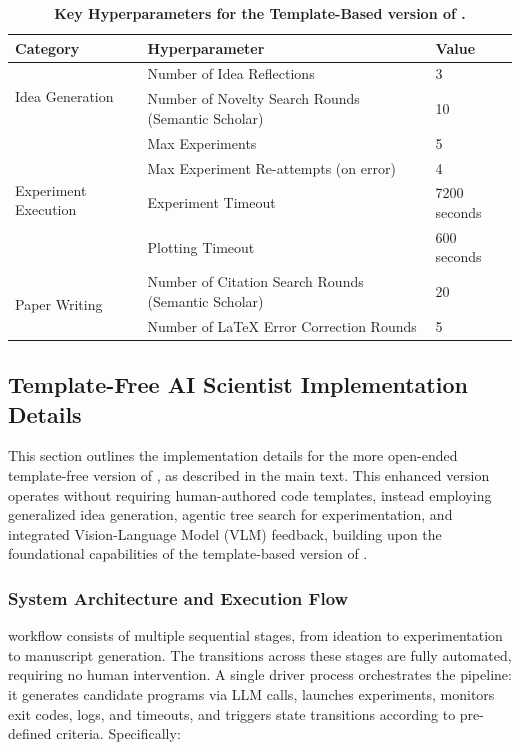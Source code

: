 \begin{appendices}
\begin{table}[h!]
\centering
\caption{\textbf{Key Hyperparameters for the Template-Based version of \ouralgo.}}
\label{tab:v1_hyperparameters}
\begin{tabular}{@{}lll@{}}
\toprule
\textbf{Category} & \textbf{Hyperparameter} & \textbf{Value} \\ \midrule
\multirow{2}{*}{Idea Generation} & Number of Idea Reflections & 3 \\
 & Number of Novelty Search Rounds (Semantic Scholar) & 10 \\ \midrule
\multirow{4}{*}{Experiment Execution} & Max Experiments & 5 \\
 & Max Experiment Re-attempts (on error) & 4 \\
 & Experiment Timeout & 7200 seconds \\
 & Plotting Timeout & 600 seconds \\ \midrule
\multirow{2}{*}{Paper Writing} & Number of Citation Search Rounds (Semantic Scholar) & 20 \\
 & Number of LaTeX Error Correction Rounds & 5 \\
\bottomrule
\end{tabular}
\end{table}


\subsection{Template-Free AI Scientist Implementation Details}
\label{app:v2_details}

This section outlines the implementation details for the more open-ended template-free version of \ouralgo, as described in the main text.
This enhanced version operates without requiring human-authored code templates, instead employing generalized idea generation, agentic tree search for experimentation, and integrated Vision-Language Model (VLM) feedback, building upon the foundational capabilities of the template-based version of \ouralgo.

\subsubsection{System Architecture and Execution Flow}

\ouralgo workflow consists of multiple sequential stages, from ideation to experimentation to manuscript generation.
The transitions across these stages are fully automated, requiring no human intervention.
A single driver process orchestrates the pipeline: it generates candidate programs via LLM calls, launches experiments, monitors exit codes, logs, and timeouts, and triggers state transitions according to pre-defined criteria. Specifically:


\end{appendices}
